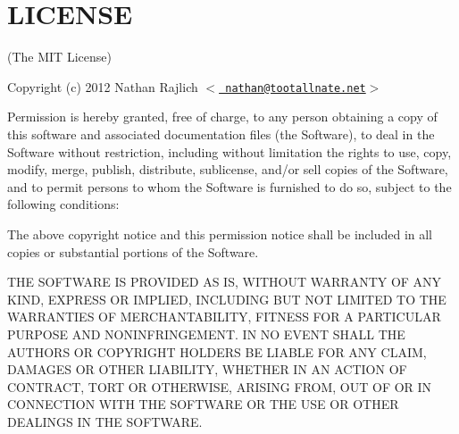 \chapter{LICENSE}
\hypertarget{md_node__modules_2bindings_2_l_i_c_e_n_s_e}{}\label{md_node__modules_2bindings_2_l_i_c_e_n_s_e}
(The MIT License)

Copyright (c) 2012 Nathan Rajlich \texorpdfstring{$<$}{<}\href{mailto:nathan@tootallnate.net}{\texttt{ nathan@tootallnate.\+net}}\texorpdfstring{$>$}{>}

Permission is hereby granted, free of charge, to any person obtaining a copy of this software and associated documentation files (the \textquotesingle{}Software\textquotesingle{}), to deal in the Software without restriction, including without limitation the rights to use, copy, modify, merge, publish, distribute, sublicense, and/or sell copies of the Software, and to permit persons to whom the Software is furnished to do so, subject to the following conditions\+:

The above copyright notice and this permission notice shall be included in all copies or substantial portions of the Software.

THE SOFTWARE IS PROVIDED \textquotesingle{}AS IS\textquotesingle{}, WITHOUT WARRANTY OF ANY KIND, EXPRESS OR IMPLIED, INCLUDING BUT NOT LIMITED TO THE WARRANTIES OF MERCHANTABILITY, FITNESS FOR A PARTICULAR PURPOSE AND NONINFRINGEMENT. IN NO EVENT SHALL THE AUTHORS OR COPYRIGHT HOLDERS BE LIABLE FOR ANY CLAIM, DAMAGES OR OTHER LIABILITY, WHETHER IN AN ACTION OF CONTRACT, TORT OR OTHERWISE, ARISING FROM, OUT OF OR IN CONNECTION WITH THE SOFTWARE OR THE USE OR OTHER DEALINGS IN THE SOFTWARE. 